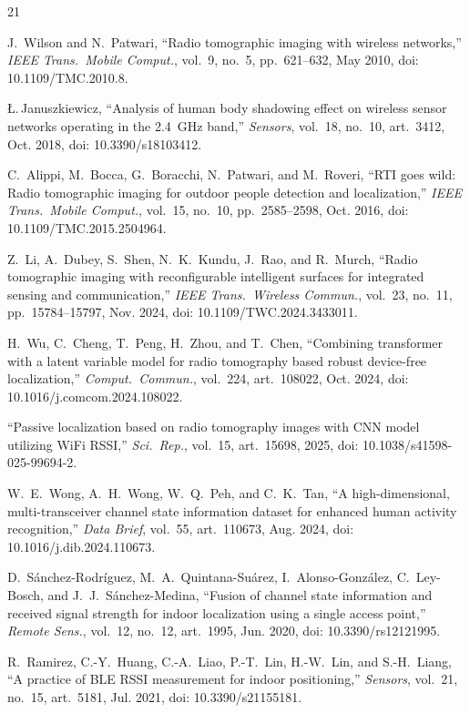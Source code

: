 \documentclass[journal,10pt]{IEEEtran}
\begin{document}
\begin{thebibliography}{21}

 J.~Wilson and N.~Patwari, ``Radio tomographic imaging with
wireless networks,'' \emph{IEEE Trans.\ Mobile Comput.}, vol.~9, no.~5,
pp.~621--632, May 2010, doi: 10.1109/TMC.2010.8.

 {\L}.\,Januszkiewicz, ``Analysis of human body
shadowing effect on wireless sensor networks operating in the 2.4~GHz band,''
\emph{Sensors}, vol.~18, no.~10, art.~3412, Oct. 2018, doi:
10.3390/s18103412.

 C.~Alippi, M.~Bocca, G.~Boracchi, N.~Patwari, and
M.~Roveri, ``RTI goes wild: Radio tomographic imaging for outdoor people
detection and localization,'' \emph{IEEE Trans.\ Mobile Comput.}, vol.~15,
no.~10, pp.~2585--2598, Oct. 2016, doi: 10.1109/TMC.2015.2504964.

 Z.~Li, A.~Dubey, S.~Shen, N.~K.~Kundu, J.~Rao, and R.~Murch,
``Radio tomographic imaging with reconfigurable intelligent surfaces for
integrated sensing and communication,'' \emph{IEEE Trans.\ Wireless Commun.},
vol.~23, no.~11, pp.~15784--15797, Nov. 2024, doi: 10.1109/TWC.2024.3433011.

 H.~Wu, C.~Cheng, T.~Peng, H.~Zhou, and T.~Chen, ``Combining
transformer with a latent variable model for radio tomography based robust
device-free localization,'' \emph{Comput.\ Commun.}, vol.~224, art.~108022,
Oct. 2024, doi: 10.1016/j.comcom.2024.108022.

 ``Passive localization based on radio tomography images
with CNN model utilizing WiFi RSSI,'' \emph{Sci.\ Rep.}, vol.~15, art.~15698,
2025, doi: 10.1038/s41598-025-99694-2.

 W.~E.~Wong, A.~H.~Wong, W.~Q.~Peh, and C.~K.~Tan, ``A
high-dimensional, multi-transceiver channel state information dataset for
enhanced human activity recognition,'' \emph{Data Brief}, vol.~55,
art.~110673, Aug. 2024, doi: 10.1016/j.dib.2024.110673.

 D.~S\'anchez-Rodr\'iguez, M.~A.~Quintana-Su\'arez,
I.~Alonso-Gonz\'alez, C.~Ley-Bosch, and J.~J.~S\'anchez-Medina, ``Fusion of
channel state information and received signal strength for indoor localization
using a single access point,'' \emph{Remote Sens.}, vol.~12, no.~12,
art.~1995, Jun. 2020, doi: 10.3390/rs12121995.

 R.~Ramirez, C.-Y.~Huang, C.-A.~Liao, P.-T.~Lin, H.-W.~Lin,
and S.-H.~Liang, ``A practice of BLE RSSI measurement for indoor positioning,''
\emph{Sensors}, vol.~21, no.~15, art.~5181, Jul. 2021, doi: 10.3390/s21155181.


\end{thebibliography}
\end{document}
